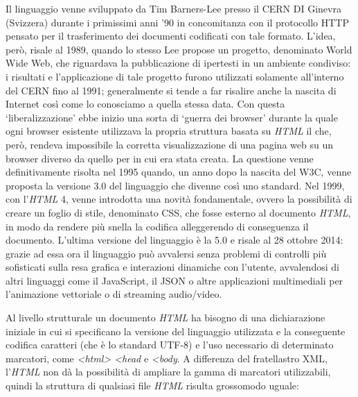 {{Il linguaggio venne sviluppato da Tim Barners-Lee presso il CERN DI
Ginevra (Svizzera) durante i primissimi anni '90 in concomitanza con il
protocollo HTTP pensato per il trasferimento dei documenti codificati
con tale formato. L'idea, però, risale al 1989, quando lo stesso Lee
propose un progetto, denominato World Wide Web, che riguardava la
pubblicazione di ipertesti in un ambiente condiviso: i risultati e
l'applicazione di tale progetto furono utilizzati solamente all'interno
del CERN fino al 1991; generalmente si tende a far risalire anche la
nascita di Internet così come lo conosciamo a quella stessa data. Con
questa `liberalizzazione' ebbe inizio una sorta di `guerra dei browser'
durante la quale ogni browser esistente utilizzava la propria struttura
basata su \emph{HTML} il che, però, rendeva impossibile la corretta
visualizzazione di una pagina web su un browser diverso da quello per in
cui era stata creata. La questione venne definitivamente risolta nel
1995 quando, un anno dopo la nascita del W3C, venne proposta la versione
3.0 del linguaggio che divenne così uno standard. Nel 1999, con
l'\emph{HTML} 4, venne introdotta una novità fondamentale, ovvero la
possibilità di creare un foglio di stile, denominato CSS, che fosse
esterno al documento \emph{HTML}, in modo da rendere più snella la
codifica alleggerendo di conseguenza il documento. L'ultima versione del
linguaggio è la 5.0 e risale al 28 ottobre 2014: grazie ad essa ora il
linguaggio può avvalersi senza problemi di controlli più sofisticati
sulla resa grafica e interazioni dinamiche con l'utente, avvalendosi di
altri linguaggi come il JavaScript, il JSON o altre applicazioni
multimediali per l'animazione vettoriale o di streaming audio/video.

Al livello strutturale un documento \emph{HTML} ha bisogno di una
dichiarazione iniziale in cui si specificano la versione del linguaggio
utilizzata e la conseguente codifica caratteri (che è lo standard UTF-8)
e l'uso necessario di determinato marcatori, come
\emph{\textless{}html\textgreater{} \textless{}head} e
\emph{\textless{}body}. A differenza del fratellastro XML,
l'\emph{HTML} non dà la possibilità di ampliare la gamma di marcatori
utilizzabili, quindi la struttura di qualsiasi file \emph{HTML} risulta
grossomodo uguale:

}}
